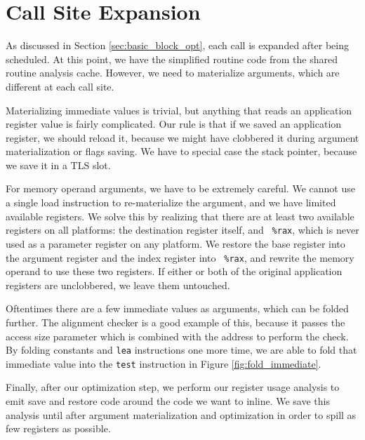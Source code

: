 \section{Call Site Expansion}
\label{sec:site_expansion}

As discussed in Section \ref{sec:basic_block_opt}, each call is expanded after
being scheduled.  At this point, we have the simplified routine code from the
shared routine analysis cache.  However, we need to materialize arguments, which
are different at each call site.

Materializing immediate values is trivial, but anything that reads an
application register value is fairly complicated.  Our rule is that if we saved
an application register, we should reload it, because we might have clobbered it
during argument materialization or flags saving.  We have to special case the
stack pointer, because we save it in a TLS slot.

For memory operand arguments, we have to be extremely careful.  We cannot use a
single load instruction to re-materialize the argument, and we have limited
available registers.  We solve this by realizing that there are at least two
available registers on all platforms: the destination register itself, and {\tt
\%rax}, which is never used as a parameter register on any platform.  We restore
the base register into the argument register and the index register into {\tt
\%rax}, and rewrite the memory operand to use these two registers.  If either or
both of the original application registers are unclobbered, we leave them
untouched.

Oftentimes there are a few immediate values as arguments, which can be folded
further.  The alignment checker is a good example of this, because it passes the
access size parameter which is combined with the address to perform the check.
By folding constants and {\tt lea} instructions one more time, we are able to
fold that immediate value into the {\tt test} instruction in Figure
\ref{fig:fold_immediate}.

Finally, after our optimization step, we perform our register usage analysis to
emit save and restore code around the code we want to inline.  We save this
analysis until after argument materialization and optimization in order to spill
as few registers as possible.
